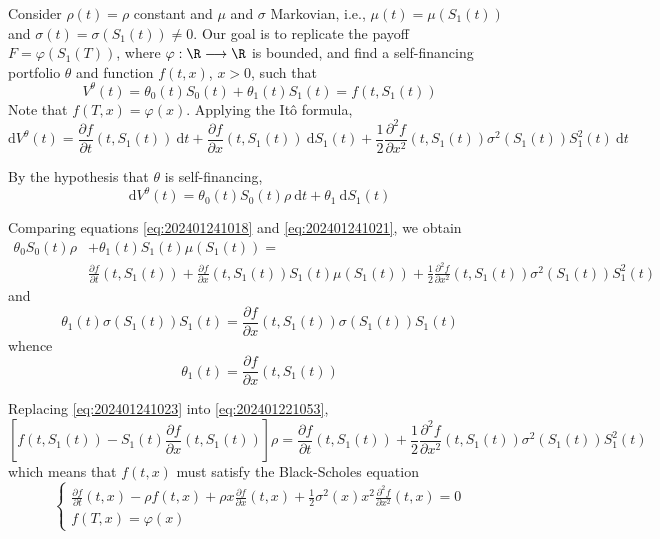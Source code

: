 Consider $\rho(t) = \rho$ constant and $\mu$ and $\sigma$ Markovian, i.e., $\mu(t) = \mu(S_1(t))$ and $\sigma(t) = \sigma(S_1(t)) \neq 0$. Our goal is to replicate the payoff $F = \varphi(S_1(T))$, where $\varphi : \R \longrightarrow \R$ is bounded, and find a self-financing portfolio $\theta$ and function $f(t,x)$, $x > 0$, such that 
\[
V^\theta(t) = \theta_0(t) S_0(t) + \theta_1(t) S_1(t) = f(t, S_1(t))
\]
Note that $f(T, x) = \varphi(x)$. Applying the Itô formula, 
\begin{equation}\label{eq:202401241018}
\mathrm{d} V^\theta(t) = \frac{\partial f}{\partial t}(t, S_1(t)) ~\mathrm{d}t + \frac{\partial f}{\partial x}(t, S_1(t)) ~\mathrm{d}S_1(t) + \frac{1}{2} \frac{\partial^2 f}{\partial x^2}(t, S_1(t)) \sigma^2(S_1(t)) S_1^2(t) ~\mathrm{d}t
\end{equation}

By the hypothesis that $\theta$ is self-financing,
\begin{equation}\label{eq:202401241021}
\mathrm{d} V^\theta(t) = \theta_0(t) S_0(t) \rho ~\mathrm{d}t + \theta_1 ~\mathrm{d}S_1(t)
\end{equation}

Comparing equations \eqref{eq:202401241018} and \eqref{eq:202401241021}, we obtain
\begin{equation}\label{eq:202401221053}
\begin{aligned}
	\theta_0 S_0(t) \rho &+ \theta_1(t) S_1(t)\mu(S_1(t)) = \\
	& \frac{\partial f}{\partial t}(t, S_1(t)) + \frac{\partial f}{\partial x}(t, S_1(t)) S_1(t) \mu(S_1(t)) + \frac{1}{2} \frac{\partial^2 f}{\partial x^2}(t, S_1(t)) \sigma^2(S_1(t)) S_1^2(t)
\end{aligned}
\end{equation}
and
\begin{equation*}
\theta_1(t) \sigma(S_1(t)) S_1(t) = \frac{\partial f}{\partial x}(t, S_1(t)) \sigma(S_1(t)) S_1(t)
\end{equation*}
whence 
\begin{equation}\label{eq:202401241023}
\theta_1(t) = \frac{\partial f}{\partial x}(t, S_1(t))
\end{equation}

Replacing \eqref{eq:202401241023} into \eqref{eq:202401221053},
\begin{equation*}
\left[ f(t, S_1(t)) - S_1(t) \frac{\partial f}{\partial x}(t, S_1(t)) \right] \rho = \frac{\partial f}{\partial t}(t, S_1(t)) + \frac{1}{2} \frac{\partial^2 f}{\partial x^2}(t, S_1(t)) \sigma^2(S_1(t)) S_1^2(t)
\end{equation*}
which means that $f(t,x)$ must satisfy the Black-Scholes equation
\begin{equation*}
\begin{cases}
	\frac{\partial f}{\partial t}(t, x) - \rho f(t,x) + \rho x \frac{\partial f}{\partial x}(t, x) + \frac{1}{2} \sigma^2(x) x^2 \frac{\partial^2 f}{\partial x^2}(t, x) = 0 \\
	f(T,x) = \varphi(x)
\end{cases}
\end{equation*}

